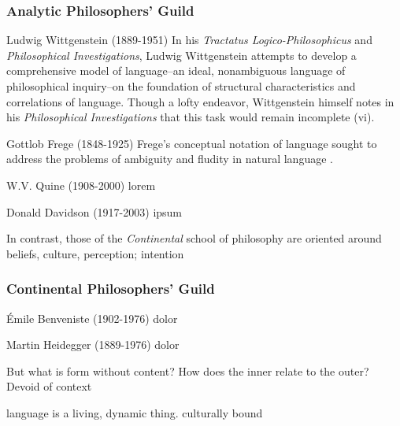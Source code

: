 \documentclass[10pt,twoside,twocolumn,openany,nomultitoc]{book}
\begin{document}
\subsubsection{Analytic Philosophers' Guild}
    \begin{DndComment}{Ludwig Wittgenstein (1889-1951)}
    In his \textit{Tractatus Logico-Philosophicus} and \textit{Philosophical Investigations}, Ludwig Wittgenstein attempts to develop a comprehensive model of language--an ideal, nonambiguous language of philosophical inquiry--on the foundation of structural characteristics and correlations of language.  Though a lofty endeavor, Wittgenstein himself notes in his \textit{Philosophical Investigations} that this task would remain incomplete (vi). 
    \end{DndComment} 
    \begin{DndComment}{Gottlob Frege (1848-1925)}
    Frege's conceptual notation of language sought to address the problems of ambiguity and fludity in natural language \parencite[p. 4]{big-questions}.
    \end{DndComment}
    \begin{DndComment}{W.V. Quine (1908-2000)}
    lorem
    \end{DndComment}
    \begin{DndComment}{Donald Davidson (1917-2003)}
    ipsum
    \end{DndComment}
    
        
In contrast, those of the \textit{Continental} school of philosophy are oriented around    
beliefs, culture, perception; intention  
    
\subsubsection{Continental Philosophers' Guild}
    \begin{DndComment}{Émile Benveniste (1902-1976)}
   dolor
    \end{DndComment}     
    \begin{DndComment}{Martin Heidegger (1889-1976)}
   dolor
    \end{DndComment}   

But what is form without content? How does the inner relate to the outer? 
Devoid of context

language is a living, dynamic thing. culturally bound
    
\end{document}
